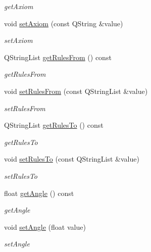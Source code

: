 \begin{DoxyCompactItemize}
\begin{DoxyCompactList}\small\item\em get\+Axiom \end{DoxyCompactList}\item 
void \hyperlink{classLSystem_a01c83e49821d4d19c83dc7d3bb8da97c}{set\+Axiom} (const Q\+String \&value)
\begin{DoxyCompactList}\small\item\em set\+Axiom \end{DoxyCompactList}\item 
Q\+String\+List \hyperlink{classLSystem_a05707c5386d45068ec6ef243f45abe72}{get\+Rules\+From} () const
\begin{DoxyCompactList}\small\item\em get\+Rules\+From \end{DoxyCompactList}\item 
void \hyperlink{classLSystem_aa641b21a2548158b5b45b42d2c836b1b}{set\+Rules\+From} (const Q\+String\+List \&value)
\begin{DoxyCompactList}\small\item\em set\+Rules\+From \end{DoxyCompactList}\item 
Q\+String\+List \hyperlink{classLSystem_aae9f8d83e3f0b2ad3805ce7cfe423754}{get\+Rules\+To} () const
\begin{DoxyCompactList}\small\item\em get\+Rules\+To \end{DoxyCompactList}\item 
void \hyperlink{classLSystem_a803c72892ac4cb38f080b9a131235d7e}{set\+Rules\+To} (const Q\+String\+List \&value)
\begin{DoxyCompactList}\small\item\em set\+Rules\+To \end{DoxyCompactList}\item 
float \hyperlink{classLSystem_ad8747dbe41d79ae7ac257b78a967ebc0}{get\+Angle} () const
\begin{DoxyCompactList}\small\item\em get\+Angle \end{DoxyCompactList}\item 
void \hyperlink{classLSystem_a9669053a1e08edfd525b933a99ab528d}{set\+Angle} (float value)
\begin{DoxyCompactList}\small\item\em set\+Angle \end{DoxyCompactList}\item 

\end{DoxyCompactItemize}
